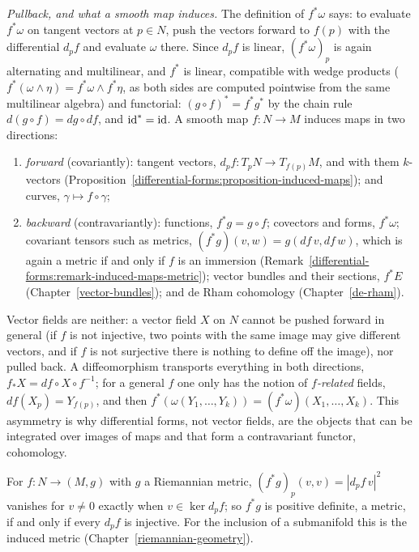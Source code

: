 \begin{remark}\label{differential-forms:remark-induced-maps}
\emph{Pullback, and what a smooth map induces.} The definition of $f^*\omega$ says: to evaluate $f^*\omega$ on tangent vectors at $p \in N$, push the vectors forward to $f(p)$ with the differential $d_pf$ and
evaluate $\omega$ there. Since $d_pf$ is linear, $(f^*\omega)_p$ is again alternating and multilinear, and $f^*$ is linear, compatible with wedge products ($f^*(\omega \wedge \eta) = f^*\omega \wedge f^*\eta$, as
both sides are computed pointwise from the same multilinear algebra) and functorial: $(g \circ f)^* = f^*g^*$ by the chain rule $d(g \circ f) = dg \circ df$, and $\mathrm{id}^* = \mathrm{id}$. A smooth map
$f \colon N \to M$ induces maps in two directions:
\begin{enumerate}
\item \emph{forward} (covariantly): tangent vectors, $d_pf \colon T_pN \to T_{f(p)}M$, and with them $k$-vectors
(Proposition~\ref{differential-forms:proposition-induced-maps}); and curves, $\gamma \mapsto f \circ \gamma$;
\item \emph{backward} (contravariantly): functions, $f^*g = g \circ f$; covectors and forms, $f^*\omega$; covariant tensors such as metrics, $(f^*g)(v, w) = g(df\,v, df\,w)$, which is again a metric if and only if
$f$ is an immersion (Remark~\ref{differential-forms:remark-induced-maps-metric}); vector bundles and their sections, $f^*E$ (Chapter~\ref{vector-bundles}); and de Rham cohomology (Chapter~\ref{de-rham}).
\end{enumerate}
Vector fields are neither: a vector field $X$ on $N$ cannot be pushed forward in general (if $f$ is not injective, two points with the same image may give different vectors, and if $f$ is not surjective
there is nothing to define off the image), nor pulled back. A diffeomorphism transports everything in both directions, $f_*X = df \circ X \circ f^{-1}$; for a general $f$ one only has the notion of
\emph{$f$-related} fields, $df(X_p) = Y_{f(p)}$, and then $f^*(\omega(Y_1, \ldots, Y_k)) = (f^*\omega)(X_1, \ldots, X_k)$. This asymmetry is why differential forms, not vector fields, are the objects that
can be integrated over images of maps and that form a contravariant functor, cohomology.
\end{remark}

\begin{remark}\label{differential-forms:remark-induced-maps-metric}
For $f \colon N \to (M, g)$ with $g$ a Riemannian metric, $(f^*g)_p(v, v) = |d_pf\,v|^2$ vanishes for $v \neq 0$ exactly when $v \in \ker d_pf$; so $f^*g$ is positive definite, a metric, if and only if every $d_pf$ is
injective. For the inclusion of a submanifold this is the induced metric (Chapter~\ref{riemannian-geometry}).
\end{remark}

